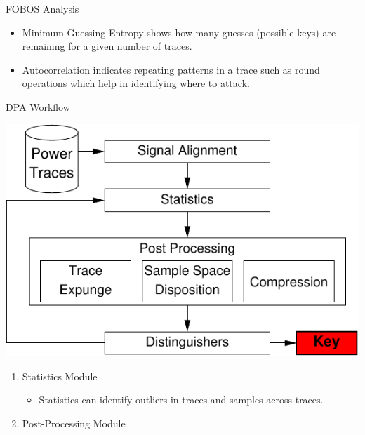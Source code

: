 \documentclass[xcolor=pdftex,dvipsnames,table,final]{beamer}
\begin{document}
\begin{frame}[fragile]{}
\begin{columns}[t]
\begin{column}{.31\linewidth}
\begin{block}{FOBOS Analysis}
\begin{minipage}{0.69\linewidth}
        \end{minipage}
	\hspace{-5ex}
	\begin{minipage}{0.31\linewidth}
          {\small
          \begin{itemize}
            \item Minimum Guessing Entropy shows how many guesses (possible keys) are 
                  remaining for a given number of traces. 
            \item Autocorrelation indicates repeating patterns in a trace such as round 
                  operations which help in identifying where to attack. 
          \end{itemize}
          }  
	\end{minipage} 
       \end{block}
       \begin{block}{DPA Workflow}
        \vspace{-1ex}
        \begin{center}
          \includegraphics[scale=1.5]{../figures/data_anl}
        \end{center} 
        \vspace{-1ex}
        \begin{enumerate}
          \item Statistics Module
          \begin{itemize}
            \item Statistics can identify outliers in traces and samples across traces.
          \end{itemize}
          \item Post-Processing Module

\end{enumerate}
\end{block}
\end{column}
\end{columns}
\end{frame}
\end{document}
